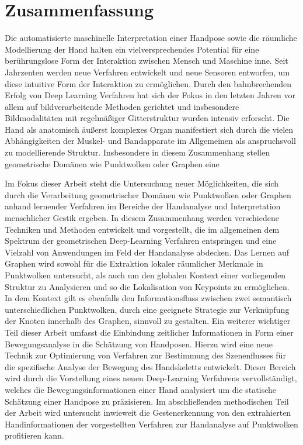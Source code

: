 \documentclass[11pt,a4paper,twoside,headsepline,titlepage,parskip=off,DIV=11,BCOR=12mm,captions=tableheading,chapterprefix=on,numbers=noenddot]{scrbook}
\begin{document}
\chapter*{Zusammenfassung}
Die automatisierte maschinelle Interpretation einer Handpose sowie die räumliche Modellierung der Hand halten ein vielversprechendes Potential für eine berührungslose Form der Interaktion zwischen Mensch und Maschine inne. Seit Jahrzenten werden neue Verfahren entwickelt und neue Sensoren entworfen, um diese intuitive Form der Interaktion zu ermöglichen. Durch den bahnbrechenden Erfolg von Deep Learning Verfahren hat sich der Fokus in den letzten Jahren vor allem auf bildverarbeitende Methoden gerichtet und insbesondere Bildmodalitäten mit regelmäßiger Gitterstruktur wurden intensiv erforscht. Die Hand als anatomisch äußerst komplexes Organ manifestiert sich durch die vielen Abhängigkeiten der Muskel- und Bandapparate im Allgemeinen als anspruchsvoll zu modellierende Struktur. Insbesondere in diesem Zusammenhang stellen geometrische Domänen wie Punktwolken oder Graphen eine

Im Fokus dieser Arbeit steht die Untersuchung neuer Möglichkeiten, die sich durch die Verarbeitung geometrischer Domänen wie Punktwolken oder Graphen anhand lernender Verfahren im Bereiche der Handanalyse und Interpretation menschlicher Gestik ergeben. In diesem Zusammenhang werden verschiedene Techniken und Methoden entwickelt und vorgestellt, die im allgemeinen dem Spektrum der geometrischen Deep-Learning Verfahren entspringen und eine Vielzahl von Anwendungen im Feld der Handanalyse abdecken.
Das Lernen auf Graphen wird sowohl für die Extraktion lokaler räumlicher Merkmale in Punktwolken untersucht, als auch um den globalen Kontext einer vorliegenden Struktur zu Analysieren und so die Lokalisation von Keypoints zu ermöglichen. In dem Kontext gilt es ebenfalls den Informationsfluss zwischen zwei semantisch unterschiedlichen Punktwolken, durch eine geeignete Strategie zur Verknüpfung der Knoten innerhalb des Graphen, sinnvoll zu gestalten.
Ein weiterer wichtiger Teil dieser Arbeit umfasst die Einbindung zeitlicher Informationen in Form einer Bewegungsanalyse in die Schätzung von Handposen. Hierzu wird eine neue Technik zur Optimierung von Verfahren zur Bestimmung des Szenenflusses für die spezifische Analyse der Bewegung des Handskeletts entwickelt. Dieser Bereich wird durch die Vorstellung eines neuen Deep-Learning Verfahrens vervollständigt, welches die Bewegungsinformationen einer Hand analysiert um die statische Schätzung einer Handpose zu präzisieren.
Im abschließenden methodischen Teil der Arbeit wird untersucht inwieweit die Gestenerkennung von den extrahierten Handinformationen der vorgestellten Verfahren zur Handanalyse auf Punktwolken profitieren kann.
\end{document}
